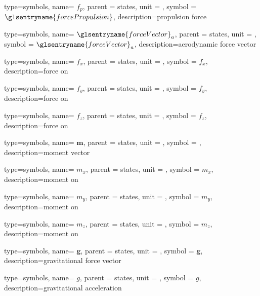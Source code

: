 {type=symbols,
	name= \ensuremath{f_{p}},
	parent = {states},
	unit = \unexpanded{\si{\newton}},
	symbol = \ensuremath{\glsentryname{forcePropulsion}},
	description={propulsion force}
}


{type=symbols,
	name= \ensuremath{{\glsentryname{forceVector}}_{a}},
	parent = {states},
	unit = \unexpanded{},
	symbol = \ensuremath{{\glsentryname{forceVector}}_{a}},
	description={aerodynamic force vector}
}

{type=symbols,
	name= \ensuremath{f_{x}},
	parent = {states},
	unit = \unexpanded{\si{\newton}},
	symbol = \ensuremath{f_{x}},
	description={force on }
}

{type=symbols,
	name= \ensuremath{f_{y}},
	parent = {states},
	unit = \unexpanded{\si{\newton}},
	symbol = \ensuremath{f_{y}},
	description={force on }
}

{type=symbols,
	name= \ensuremath{f_{z}},
	parent = {states},
	unit = \unexpanded{\si{\newton}},
	symbol = \ensuremath{f_{z}},
	description={force on }
}


{type=symbols,
	name= \ensuremath{\mathbf{m}},
	parent = {states},
	unit = \unexpanded{},
	symbol = ,
	description={moment vector}
}

{type=symbols,
	name= \ensuremath{m_{x}},
	parent = {states},
	unit = \unexpanded{\si{\newton\meter}},
	symbol = \ensuremath{m_{x}},
	description={moment on }
}

{type=symbols,
	name= \ensuremath{m_{y}},
	parent = {states},
	unit = \unexpanded{\si{\newton\meter}},
	symbol = \ensuremath{m_{y}},
	description={moment on }
}

{type=symbols,
	name= \ensuremath{m_{z}},
	parent = {states},
	unit = \unexpanded{\si{\newton\meter}},
	symbol = \ensuremath{m_{z}},
	description={moment on }
}

{type=symbols,
	name= \ensuremath{\mathbf{g}},
	parent = {states},
	unit = \unexpanded{},
	symbol = \ensuremath{\mathbf{g}},
	description={gravitational force vector}
}

{type=symbols,
	name= \ensuremath{g},
	parent = {states},
	unit = \unexpanded{\si{\meter\per\second\squared}},
	symbol = \ensuremath{g},
	description={gravitational acceleration}
}

